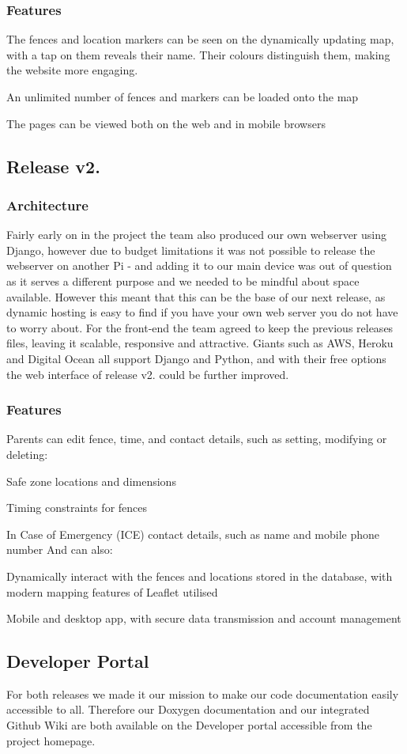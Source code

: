 \subsubsection*{Features}


\begin{DoxyItemize}
\item The fences and location markers can be seen on the dynamically updating map, with a tap on them reveals their name. Their colours distinguish them, making the website more engaging.
\item An unlimited number of fences and markers can be loaded onto the map
\item The pages can be viewed both on the web and in mobile browsers
\end{DoxyItemize}

\subsection*{Release v2.}

\subsubsection*{Architecture}

Fairly early on in the project the team also produced our own webserver using Django, however due to budget limitations it was not possible to release the webserver on another Pi -\/ and adding it to our main device was out of question as it serves a different purpose and we needed to be mindful about space available. However this meant that this can be the base of our next release, as dynamic hosting is easy to find if you have your own web server you do not have to worry about. For the front-\/end the team agreed to keep the previous release\textquotesingle{}s files, leaving it scalable, responsive and attractive. Giants such as A\+WS, Heroku and Digital Ocean all support Django and Python, and with their free options the web interface of release v2. could be further improved. 

\subsubsection*{Features}

Parents can edit fence, time, and contact details, such as setting, modifying or deleting\+:
\begin{DoxyItemize}
\item Safe zone locations and dimensions
\item Timing constraints for fences
\item In Case of Emergency (I\+CE) contact details, such as name and mobile phone number And can also\+:
\item Dynamically interact with the fences and locations stored in the database, with modern mapping features of Leaflet utilised
\item Mobile and desktop app, with secure data transmission and account management
\end{DoxyItemize}

\subsection*{Developer Portal}

For both releases we made it our mission to make our code documentation easily accessible to all. Therefore our Doxygen documentation and our integrated Github Wiki are both available on the Developer portal accessible from the project homepage. 